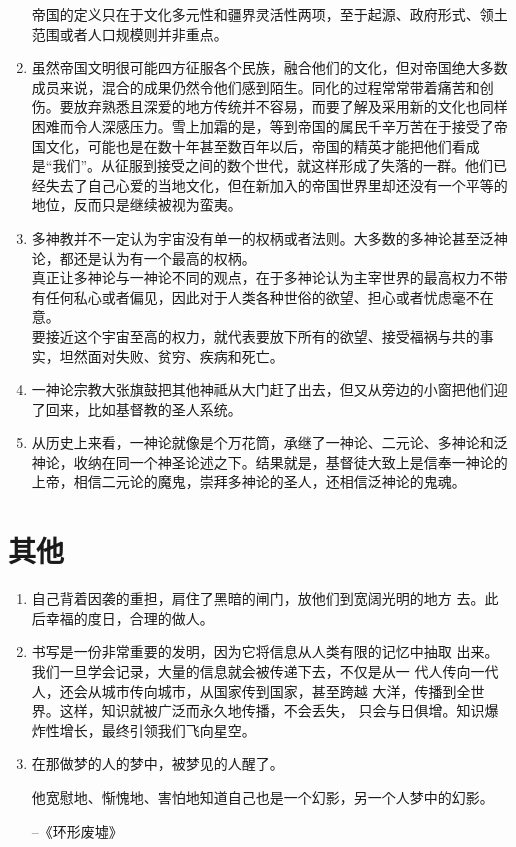 \documentclass[UTF8]{ctexart}
\begin{document}
\begin{enumerate}
			帝国的定义只在于文化多元性和疆界灵活性两项，至于起源、政府形式、领土范围或者人口规模则并非重点。
			\item 虽然帝国文明很可能四方征服各个民族，融合他们的文化，但对帝国绝大多数成员来说，混合的成果仍然令他们感到陌生。同化的过程常常带着痛苦和创伤。要放弃熟悉且深爱的地方传统并不容易，而要了解及采用新的文化也同样困难而令人深感压力。雪上加霜的是，等到帝国的属民千辛万苦在于接受了帝国文化，可能也是在数十年甚至数百年以后，帝国的精英才能把他们看成是“我们”。从征服到接受之间的数个世代，就这样形成了失落的一群。他们已经失去了自己心爱的当地文化，但在新加入的帝国世界里却还没有一个平等的地位，反而只是继续被视为蛮夷。
			\item 多神教并不一定认为宇宙没有单一的权柄或者法则。大多数的多神论甚至泛神论，都还是认为有一个最高的权柄。\\
			真正让多神论与一神论不同的观点，在于多神论认为主宰世界的最高权力不带有任何私心或者偏见，因此对于人类各种世俗的欲望、担心或者忧虑毫不在意。\\
			要接近这个宇宙至高的权力，就代表要放下所有的欲望、接受福祸与共的事实，坦然面对失败、贫穷、疾病和死亡。
			\item 一神论宗教大张旗鼓把其他神祗从大门赶了出去，但又从旁边的小窗把他们迎了回来，比如基督教的圣人系统。
			\item 从历史上来看，一神论就像是个万花筒，承继了一神论、二元论、多神论和泛神论，收纳在同一个神圣论述之下。结果就是，基督徒大致上是信奉一神论的上帝，相信二元论的魔鬼，崇拜多神论的圣人，还相信泛神论的鬼魂。
		\end{enumerate}
		
		\newpage
	
	\section{其他}
	
		\begin{enumerate}
			
			\item 自己背着因袭的重担，肩住了黑暗的闸门，放他们到宽阔光明的地方
			去。此后幸福的度日，合理的做人。
			
			\item 书写是一份非常重要的发明，因为它将信息从人类有限的记忆中抽取
			出来。我们一旦学会记录，大量的信息就会被传递下去，不仅是从一
			代人传向一代人，还会从城市传向城市，从国家传到国家，甚至跨越
			大洋，传播到全世界。这样，知识就被广泛而永久地传播，不会丢失，
			只会与日俱增。知识爆炸性增长，最终引领我们飞向星空。
			\item 在那做梦的人的梦中，被梦见的人醒了。
			
			他宽慰地、惭愧地、害怕地知道自己也是一个幻影，另一个人梦中的幻影。
			
			\hfill --《环形废墟》
			
		\end{enumerate}
		
		
	
	
	
\end{document}
